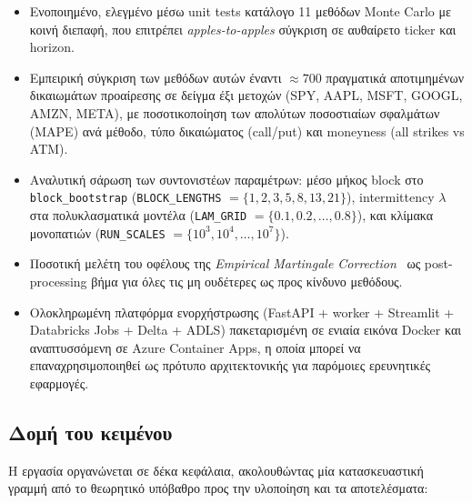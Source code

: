 \documentclass[12pt]{article}
\begin{document}
\begin{itemize}
  \item Ενοποιημένο, ελεγμένο μέσω unit tests κατάλογο 11 μεθόδων Monte Carlo με κοινή διεπαφή, που επιτρέπει \emph{apples-to-apples} σύγκριση σε αυθαίρετο ticker και horizon.
  \item Εμπειρική σύγκριση των μεθόδων αυτών έναντι $\approx 700$ πραγματικά αποτιμημένων δικαιωμάτων προαίρεσης σε δείγμα έξι μετοχών (SPY, AAPL, MSFT, GOOGL, AMZN, META), με ποσοτικοποίηση των απολύτων ποσοστιαίων σφαλμάτων (MAPE) ανά μέθοδο, τύπο δικαιώματος (call/put) και moneyness (all strikes vs ATM).
  \item Αναλυτική σάρωση των συντονιστέων παραμέτρων: μέσο μήκος block στο \texttt{block\_bootstrap} (\texttt{BLOCK\_LENGTHS} $= \{1,2,3,5,8,13,21\}$), intermittency $\lambda$ στα πολυκλασματικά μοντέλα (\texttt{LAM\_GRID} $= \{0.1, 0.2, \dots, 0.8\}$), και κλίμακα μονοπατιών (\texttt{RUN\_SCALES} $= \{10^{3}, 10^{4}, \dots, 10^{7}\}$).
  \item Ποσοτική μελέτη του οφέλους της \emph{Empirical Martingale Correction}~\cite{DuanSimonato1998} ως post-processing βήμα για όλες τις μη ουδέτερες ως προς κίνδυνο μεθόδους.
  \item Ολοκληρωμένη πλατφόρμα ενορχήστρωσης (FastAPI + worker + Streamlit + Databricks Jobs + Delta + ADLS) πακεταρισμένη σε ενιαία εικόνα Docker και αναπτυσσόμενη σε Azure Container Apps, η οποία μπορεί να επαναχρησιμοποιηθεί ως πρότυπο αρχιτεκτονικής για παρόμοιες ερευνητικές εφαρμογές.
\end{itemize}

\subsection{Δομή του κειμένου}
Η εργασία οργανώνεται σε δέκα κεφάλαια, ακολουθώντας μία κατασκευαστική γραμμή από το θεωρητικό υπόβαθρο προς την υλοποίηση και τα αποτελέσματα:
\end{document}
